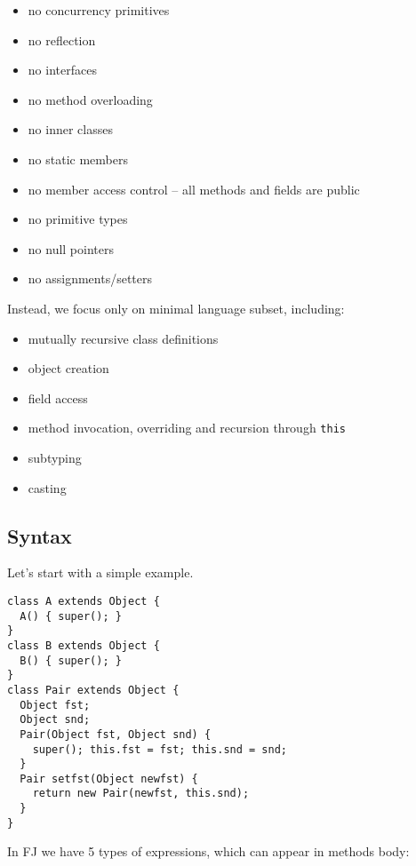 \documentclass{article}[12pt]
\begin{document}
\begin{itemize}
\item no concurrency primitives
\item no reflection
\item no interfaces
\item no method overloading
\item no inner classes
\item no static members
\item no member access control -- all methods and fields are public
\item no primitive types
\item no null pointers
\item no assignments/setters
\end{itemize}
Instead, we focus only on minimal language subset, including:

\begin{itemize}
\item mutually recursive class definitions
\item object creation
\item field access
\item method invocation, overriding and recursion through \texttt{this}
\item subtyping
\item casting
\end{itemize}


\subsection{Syntax}

Let's start with a simple example.

\begin{verbatim}
class A extends Object {
  A() { super(); }
}
class B extends Object {
  B() { super(); }
}
class Pair extends Object {
  Object fst;
  Object snd;
  Pair(Object fst, Object snd) {
    super(); this.fst = fst; this.snd = snd;
  }
  Pair setfst(Object newfst) {
    return new Pair(newfst, this.snd);
  }
}
\end{verbatim}
In FJ we have 5 types of expressions, which can appear in methods body:
\end{document}
